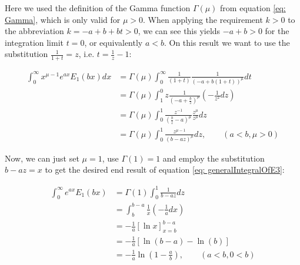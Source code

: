 \documentclass[bibliography=totocnumbered]{scrartcl}
\newcommand{\assume}[1][\text{MISSING PARAMETER}]{,\qquad\left(#1\right)}
\begin{document}
			Here we used the definition of the Gamma function $\Gamma\left(\mu\right)$ from equation \eqref{eq: Gamma}, which is only valid for $\mu>0$. When applying the requirement $k>0$ to the abbreviation $k=-a+b+bt>0$, we can see this yields $-a+b>0$ for the integration limit $t=0$, or equivalently $a<b$. On this result we want to use the substitution $\frac{1}{1+t}=z$, i.e. $t=\frac{1}{z}-1$:

			\begin{align}
				\int_{0}^{\infty}x^{\mu-1}e^{ax}E_1\left(bx\right)dx&=\Gamma\left(\mu\right)\int_{0}^{\infty}\frac{1}{\left(1+t\right)}\frac{1}{\left(-a+b\left(1+t\right)\right)^\mu}dt\\
				&=\Gamma\left(\mu\right)\int_{1}^{0}z\frac{1}{\left(-a+\frac{b}{z}\right)^{\mu}}\left(-\frac{1}{z^2}dz\right)\\
				&=\Gamma\left(\mu\right)\int_{0}^{1}\frac{z^{-1}}{\left(\frac{b}{z}-a\right)^{\mu}}\frac{z^{\mu}}{z^{\mu}}dz\\
				&=\Gamma\left(\mu\right)\int_{0}^{1}\frac{z^{\mu-1}}{\left(b-az\right)^{\mu}}dz\assume[a<b, \mu>0]
			\end{align}

			Now, we can just set $\mu=1$, use $\Gamma\left(1\right)=1$ and employ the substitution $b-az=x$ to get the desired end result of equation \eqref{eq: generalIntegralOfE3}:

			\begin{align}
				\int_{0}^{\infty}e^{ax}E_1\left(bx\right)&=\Gamma\left(1\right)\int_{0}^{1}\frac{1}{b-az}dz\\
				&=\int_{b}^{b-a}\frac{1}{x}\left(-\frac{1}{a}dx\right)\\
				&=-\frac{1}{a}\left[\ln{x}\right]^{b-a}_{x=b}\\
				&=-\frac{1}{a}\left[\ln{\left(b-a\right)}-\ln{\left(b\right)}\right]\\
				&=-\frac{1}{a}\ln{\left(1-\frac{a}{b}\right)}\assume[a<b, 0<b]
			\end{align}
\end{document}
